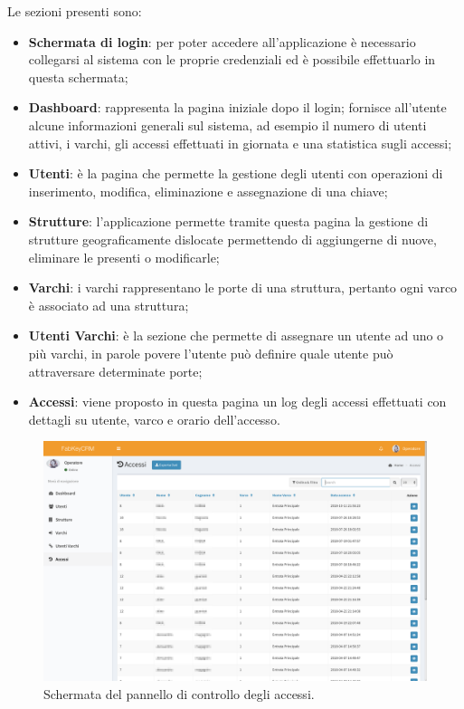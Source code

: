 Le sezioni presenti sono:
\begin{itemize}
\item \textbf{Schermata di login}: per poter accedere all'applicazione è necessario collegarsi al sistema con le proprie credenziali ed è possibile effettuarlo in questa schermata;
\item \textbf{Dashboard}: rappresenta la pagina iniziale dopo il login; fornisce all'utente alcune informazioni generali sul sistema, ad esempio il numero di utenti attivi, i varchi, gli accessi effettuati in giornata e una statistica sugli accessi;
\item \textbf{Utenti}: è la pagina che permette la gestione degli utenti con operazioni di inserimento, modifica, eliminazione e assegnazione di una chiave;
\item \textbf{Strutture}: l'applicazione permette tramite questa pagina la gestione di strutture geograficamente dislocate permettendo di aggiungerne di nuove, eliminare le presenti o modificarle;
\item \textbf{Varchi}: i varchi rappresentano le porte di una struttura, pertanto ogni varco è associato ad una struttura;
\item \textbf{Utenti Varchi}: è la sezione che permette di assegnare un utente ad uno o più varchi, in parole povere l'utente può definire quale utente può attraversare determinate porte;
\item \textbf{Accessi}: viene proposto in questa pagina un log degli accessi effettuati con dettagli su utente, varco e orario dell'accesso.
\end{itemize}

\begin{figure}[H]
	\begin{center}
	\includegraphics[scale=0.32]{immagini/accessi_crm.png}
	\caption{Schermata del pannello di controllo degli accessi.}
	\end{center}
\end{figure}

